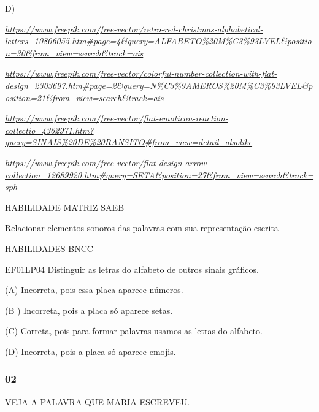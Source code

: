 \begin{escola}
D)

\href{https://www.freepik.com/free-vector/retro-red-christmas-alphabetical-letters_10806055.htm\#page=4\&query=ALFABETO\%20M\%C3\%93LVEL\&position=30\&from_view=search\&track=ais}{\emph{https://www.freepik.com/free-vector/retro-red-christmas-alphabetical-letters\_10806055.htm\#page=4\&query=ALFABETO\%20M\%C3\%93LVEL\&position=30\&from\_view=search\&track=ais}}

\href{https://www.freepik.com/free-vector/colorful-number-collection-with-flat-design_2303697.htm\#page=2\&query=N\%C3\%9AMEROS\%20M\%C3\%93LVEL\&position=21\&from_view=search\&track=ais}{\emph{https://www.freepik.com/free-vector/colorful-number-collection-with-flat-design\_2303697.htm\#page=2\&query=N\%C3\%9AMEROS\%20M\%C3\%93LVEL\&position=21\&from\_view=search\&track=ais}}

\href{https://www.freepik.com/free-vector/flat-emoticon-reaction-collectio_4362971.htm?query=SINAIS\%20DE\%20RANSITO\#from_view=detail_alsolike}{\emph{https://www.freepik.com/free-vector/flat-emoticon-reaction-collectio\_4362971.htm?query=SINAIS\%20DE\%20RANSITO\#from\_view=detail\_alsolike}}

\href{https://www.freepik.com/free-vector/flat-design-arrow-collection_12689920.htm\#query=SETA\&position=27\&from_view=search\&track=sph}{\emph{https://www.freepik.com/free-vector/flat-design-arrow-collection\_12689920.htm\#query=SETA\&position=27\&from\_view=search\&track=sph}}

HABILIDADE MATRIZ SAEB

Relacionar elementos sonoros das palavras com sua representação escrita

HABILIDADES BNCC

EF01LP04 Distinguir as letras do alfabeto de outros sinais gráficos.

(A) Incorreta, pois essa placa aparece números.

(B ) Incorreta, pois a placa só aparece setas.

(C) Correta, pois para formar palavras usamos as letras do alfabeto.

(D) Incorreta, pois a placa só aparece
emojis.\protect\hypertarget{_heading=h.kl8qv6rrx63u}{}{}

\subsubsection{02}\label{section-74}

VEJA A PALAVRA QUE MARIA ESCREVEU.


\end{escola}
